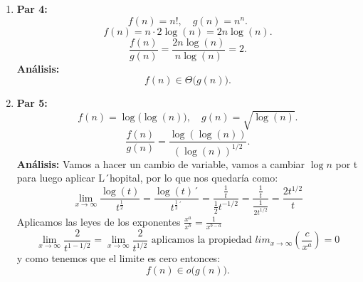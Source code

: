 \documentclass[12pt]{article}
\begin{document}
\begin{enumerate}
  \item \textbf{Par 4:} 
  \[
    f(n) = n!, \quad g(n) = n^{n}.
  \]
  \[
    f(n) = n \cdot 2\log(n)= 2n\log(n).
  \]
  \[
    \frac{f(n)}{g(n)} = \frac{2n\log(n)}{n\log(n)} = 2.
  \]
  \textbf{Análisis:}
  \[
    f(n) \in \Theta\bigl(g(n)\bigr).
  \]

  \item \textbf{Par 5:}
  \[
    f(n) = \log\bigl(\log(n)\bigr), \quad g(n) = \sqrt{\log(n)}.
  \]
  \[
    \frac{f(n)}{g(n)} = \frac{\log(\log(n))}{(\log(n))^{1/2}}.
  \]
  \textbf{Análisis:}
  Vamos a hacer un cambio de variable, vamos a cambiar $\log n$ por t para luego aplicar L´hopital, por lo que nos quedaría como:
  \[
  \lim_{x \to \infty} \frac{\log(t)}{t^{\frac{1}{2}}} = \frac{\log(t)´}{t^{\frac{1}{2}´}} = \frac{\frac{1}{t}}{\frac{1}{2}t^{-1/2}} = \frac{\frac{1}{t}}{\frac{1}{2t^{1/2}}} = \frac{2t^{1/2}}{t} 
  \]
  Aplicamos las leyes de los exponentes $\frac{x^a}{x^b}= \frac{1}{x^{b-a}}$
  \[
  \lim_{x \to \infty} \frac{2}{t^{1-1/2}} = \lim_{x \to \infty} \frac{2}{t^{1/2}} \text{ aplicamos la propiedad } lim_{x \to \infty}(\frac{c}{x^a})= 0
  \]
  y como tenemos que el limite es cero entonces:    
  \[
    f(n) \in o\bigl(g(n)\bigr).
  \]


\end{enumerate}
\end{document}
